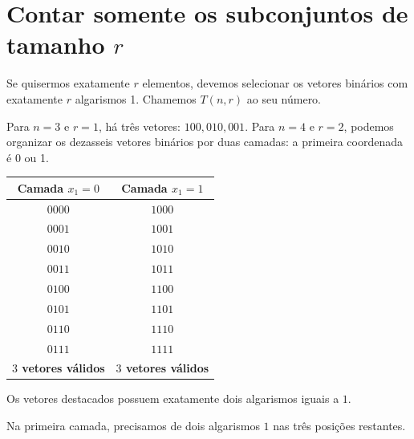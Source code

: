 \documentclass[11pt,a4paper,oneside]{book}
\renewcommand\arraystretch{1.18}
\begin{document}
\section{Contar somente os subconjuntos de tamanho \texorpdfstring{$r$}{r}}
Se quisermos exatamente $r$ elementos, devemos selecionar os vetores binários com exatamente $r$ algarismos 1. Chamemos $T(n,r)$ ao seu número.

Para $n=3$ e $r=1$, há três vetores: $100,010,001$. Para $n=4$ e $r=2$, podemos organizar os dezasseis vetores binários por duas camadas: a primeira coordenada é 0 ou 1.
\begin{center}
\end{center}

\begin{center}
\renewcommand{\arraystretch}{1.5}
\begin{tabular}{c|c}
\hline
\textbf{Camada $x_1=0$} &
\textbf{Camada $x_1=1$} \\
\hline
$0000$ & $1000$ \\
$0001$ & $\boxed{1001}$ \\
$0010$ & $\boxed{1010}$ \\
$\boxed{0011}$ & $1011$ \\
$0100$ & $\boxed{1100}$ \\
$\boxed{0101}$ & $1101$ \\
$\boxed{0110}$ & $1110$ \\
$0111$ & $1111$ \\
\hline
\textbf{$3$ vetores válidos} &
\textbf{$3$ vetores válidos} \\
\hline
\end{tabular}
\end{center}

Os vetores destacados possuem exatamente dois
algarismos iguais a $1$.

Na primeira camada, precisamos de dois algarismos
$1$ nas três posições restantes.
\end{document}
